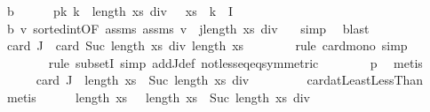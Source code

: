 \begin{isabellebody}
\ b\isanewline
\ \ \ \ \isamarkupfalse%
\ p{\isacharcolon}{\kern0pt}{\isachardoublequoteopen}{\isasymAnd}k{\isachardot}{\kern0pt}\ k\ {\isasymle}\ length\ xs\ div\ {}\ {\isasymLongrightarrow}\ xs\ {\isacharbang}{\kern0pt}\ k\ {\isasymnotin}\ I{\isachardoublequoteclose}\isanewline
\ \ \ \ \ \ \isamarkupfalse%
\ b\ v{\isacharunderscore}{\kern0pt}{}\ sorted{\isacharunderscore}{\kern0pt}int{\isacharbrackleft}{\kern0pt}OF\ assms{\isacharparenleft}{\kern0pt}{}{\isacharparenright}{\kern0pt}\ assms{\isacharparenleft}{\kern0pt}{}{\isacharparenright}{\kern0pt}\ v{\isacharunderscore}{\kern0pt}{}{\isacharcomma}{\kern0pt}\ \ j{\isacharequal}{\kern0pt}{\isachardoublequoteopen}length\ xs\ div\ {}{\isachardoublequoteclose}{\isacharbrackright}{\kern0pt}\ \isamarkupfalse%
\ simp\ \isamarkupfalse%
\ blast\isanewline
\ \ \ \ \isamarkupfalse%
\ {\isachardoublequoteopen}card\ J\ {\isasymle}\ card\ {\isacharbraceleft}{\kern0pt}Suc\ {\isacharparenleft}{\kern0pt}length\ xs\ div\ {}{\isacharparenright}{\kern0pt}{\isachardot}{\kern0pt}{\isachardot}{\kern0pt}{\isacharless}{\kern0pt}length\ xs{\isacharbraceright}{\kern0pt}{\isachardoublequoteclose}\isanewline
\ \ \ \ \ \ \isamarkupfalse%
\ {\isacharparenleft}{\kern0pt}rule\ card{\isacharunderscore}{\kern0pt}mono{\isacharcomma}{\kern0pt}\ simp{\isacharparenright}{\kern0pt}\isanewline
\ \ \ \ \ \ \isamarkupfalse%
\ {\isacharparenleft}{\kern0pt}rule\ subsetI{\isacharcomma}{\kern0pt}\ simp\ add{\isacharcolon}{\kern0pt}J{\isacharunderscore}{\kern0pt}def\ not{\isacharunderscore}{\kern0pt}less{\isacharunderscore}{\kern0pt}eq{\isacharunderscore}{\kern0pt}eq{\isacharbrackleft}{\kern0pt}symmetric{\isacharbrackright}{\kern0pt}{\isacharparenright}{\kern0pt}\isanewline
\ \ \ \ \ \ \isamarkupfalse%
\ p\ \isamarkupfalse%
\ metis\isanewline
\ \ \ \ \isamarkupfalse%
\ {\isachardoublequoteopen}card\ J\ {\isasymle}\ length\ xs\ {\isacharminus}{\kern0pt}\ {\isacharparenleft}{\kern0pt}Suc\ {\isacharparenleft}{\kern0pt}length\ xs\ div\ {}{\isacharparenright}{\kern0pt}{\isacharparenright}{\kern0pt}{\isachardoublequoteclose}\isanewline
\ \ \ \ \ \ \isamarkupfalse%
\ card{\isacharunderscore}{\kern0pt}atLeastLessThan\ \isamarkupfalse%
\ metis\isanewline
\ \ \ \ \isamarkupfalse%
\ {\isachardoublequoteopen}length\ xs\ {\isasymle}\ {}{\isacharasterisk}{\kern0pt}{\isacharparenleft}{\kern0pt}\ length\ xs\ {\isacharminus}{\kern0pt}\ {\isacharparenleft}{\kern0pt}Suc\ {\isacharparenleft}{\kern0pt}length\ xs\ div\ {}{\isacharparenright}{\kern0pt}{\isacharparenright}{\kern0pt}{\isacharparenright}{\kern0pt}{\isachardoublequoteclose}\isanewline

\end{isabellebody}
